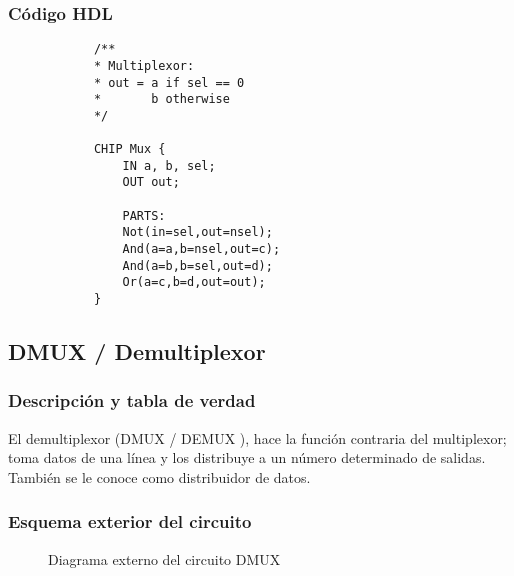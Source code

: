 \documentclass[12pt]{article}
\begin{document}
		\subsubsection{Código HDL}

		\begin{lstlisting}
			/**
			* Multiplexor:
			* out = a if sel == 0
			*       b otherwise
			*/

			CHIP Mux {
				IN a, b, sel;
				OUT out;

				PARTS:
				Not(in=sel,out=nsel);
				And(a=a,b=nsel,out=c);
				And(a=b,b=sel,out=d);
				Or(a=c,b=d,out=out);
			}
		\end{lstlisting}

		\newpage
		\subsection{DMUX / Demultiplexor}
		\subsubsection{Descripción y tabla de verdad}
		El demultiplexor (DMUX / DEMUX \cite{floyd_fundamentos_2006}), hace la función contraria del multiplexor; toma datos de una línea y los distribuye a un número determinado de salidas. También se le conoce como distribuidor de datos.

		\begin{table}[H]
			\centering
			\caption{Tabla de verdad de DMUX}
			\label{tab:dmux}
		\end{table}
		\subsubsection{Esquema exterior del circuito}
		\begin{figure}[H]
			\centering
			
			\caption{Diagrama externo del circuito DMUX} \cite{diagram}
			\label{fig:dmux_ext}
		\end{figure}
\end{document}
